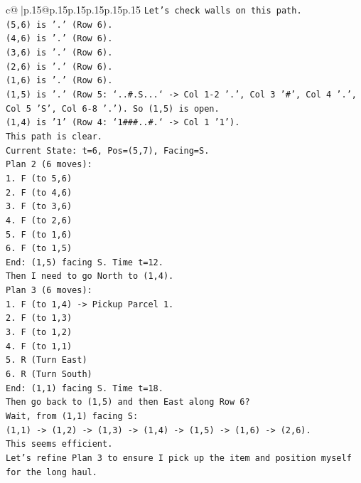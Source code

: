 \documentclass{article}
\begin{document}
{\begin{supertabular}{c@{$\;$}|p{.15\linewidth}@{}p{.15\linewidth}p{.15\linewidth}p{.15\linewidth}p{.15\linewidth}p{.15\linewidth}}
{{{\texttt{Let's check walls on this path.} \\
\texttt{(5,6) is '.' (Row 6).} \\
\texttt{(4,6) is '.' (Row 6).} \\
\texttt{(3,6) is '.' (Row 6).} \\
\texttt{(2,6) is '.' (Row 6).} \\
\texttt{(1,6) is '.' (Row 6).} \\
\texttt{(1,5) is '.' (Row 5: `..\#.S...` {-}> Col 1{-}2 '.', Col 3 '\#', Col 4 '.', Col 5 'S', Col 6{-}8 '.'). So (1,5) is open.} \\
\texttt{(1,4) is '1' (Row 4: `1\#\#\#..\#.` {-}> Col 1 '1').} \\
\texttt{This path is clear.} \\
\texttt{Current State: t=6, Pos=(5,7), Facing=S.} \\
\texttt{Plan 2 (6 moves):} \\
\texttt{1. F (to 5,6)} \\
\texttt{2. F (to 4,6)} \\
\texttt{3. F (to 3,6)} \\
\texttt{4. F (to 2,6)} \\
\texttt{5. F (to 1,6)} \\
\texttt{6. F (to 1,5)} \\
\texttt{End: (1,5) facing S. Time t=12.} \\
\texttt{Then I need to go North to (1,4).} \\
\texttt{Plan 3 (6 moves):} \\
\texttt{1. F (to 1,4) {-}> Pickup Parcel 1.} \\
\texttt{2. F (to 1,3)} \\
\texttt{3. F (to 1,2)} \\
\texttt{4. F (to 1,1)} \\
\texttt{5. R (Turn East)} \\
\texttt{6. R (Turn South)} \\
\texttt{End: (1,1) facing S. Time t=18.} \\
\texttt{Then go back to (1,5) and then East along Row 6?} \\
\texttt{Wait, from (1,1) facing S:} \\
\texttt{(1,1) {-}> (1,2) {-}> (1,3) {-}> (1,4) {-}> (1,5) {-}> (1,6) {-}> (2,6).} \\
\texttt{This seems efficient.} \\
\texttt{Let's refine Plan 3 to ensure I pick up the item and position myself for the long haul.} \\
}}}
\end{supertabular}}
\end{document}
